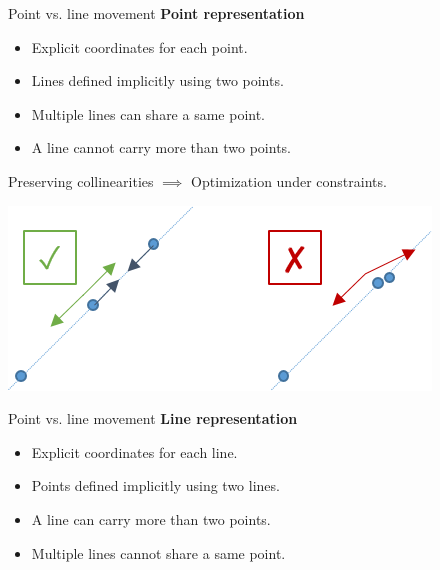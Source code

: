 \begin{frame}[t]{Point vs. line movement}
	\textbf{Point representation}
	\begin{itemize}
		\item Explicit coordinates for each point.
		\item Lines defined implicitly using two points.
	\end{itemize}	
	\begin{itemize}
		\item[\cmark] Multiple lines can share a same point.
		\item[\xmark] A line cannot carry more than two points.
	\end{itemize}
	
	Preserving collinearities $\implies$ Optimization under constraints.
	\begin{center}
		\includegraphics[width=0.6\linewidth]{point_mouvement}
	\end{center}
\end{frame}

\begin{frame}[t]{Point vs. line movement}
	\textbf{Line representation}
	\begin{itemize}
		\item Explicit coordinates for each line.
		\item Points defined implicitly using two lines.
	\end{itemize}
	\begin{itemize}
		\item[\cmark] A line can carry more than two points.
		\item[\xmark] Multiple lines cannot share a same point.
	\end{itemize}
\end{frame}

